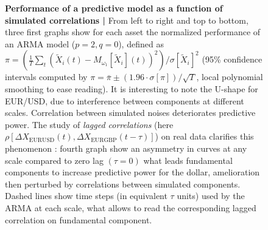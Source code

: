 \begin{figure}[h!]
\caption[Performance of a predictive model as a function of simulated correlations]{\small \textbf{Performance of a predictive model as a function of simulated correlations | } From left to right and top to bottom, three first graphs show for each asset the normalized performance of an ARMA model ($p=2,q=0$), defined as $\pi = \left(\frac{1}{T}\sum_t\left(\tilde{X}_i(t) - M_{\omega_1}\left[\tilde{X}_i\right](t)\right)^2 \right) / \sigma \left[ \tilde{X}_i \right]^2$ (95\% confidence intervals computed by $\pi = \bar{\pi} \pm (1.96\cdot \sigma [\pi])/\sqrt{T}$, local polynomial smoothing to ease reading). It is interesting to note the U-shape for EUR/USD, due to interference between components at different scales. Correlation between simulated noises deteriorates predictive power. The study of \emph{lagged correlations} (here $\rho [\Delta X_{\textrm{EURUSD}}(t),\Delta X_{\textrm{EURGBP}}(t-\tau)]$) on real data clarifies this phenomenon : fourth graph show an asymmetry in curves at any scale compared to zero lag $(\tau = 0)$ what leads fundamental components to increase predictive power for the dollar, amelioration then perturbed by correlations between simulated components. Dashed lines show time steps (in equivalent $\tau$ units) used by the ARMA at each scale, what allows to read the corresponding lagged correlation on fundamental component.}
\label{fig:model_perf}
\end{figure}







